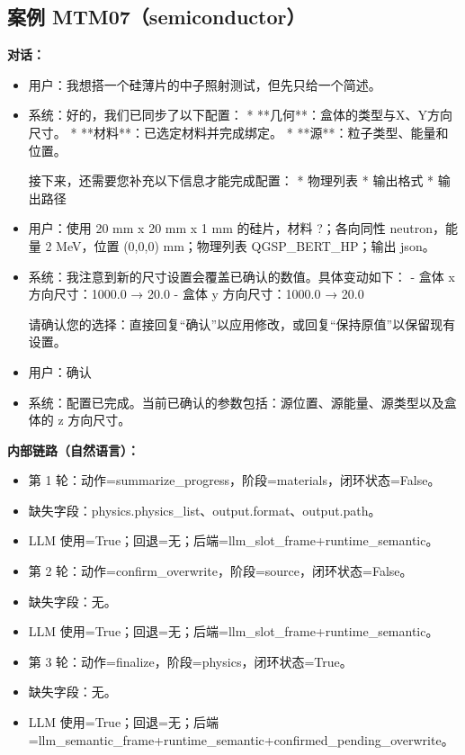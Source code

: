 \documentclass[11pt]{ctexart}
\begin{document}
\subsection{案例 MTM07（semiconductor）}
\textbf{对话：}
\begin{itemize}
\item 用户：我想搭一个硅薄片的中子照射测试，但先只给一个简述。
\item 系统：好的，我们已同步了以下配置：
*   **几何**：盒体的类型与X、Y方向尺寸。
*   **材料**：已选定材料并完成绑定。
*   **源**：粒子类型、能量和位置。

接下来，还需要您补充以下信息才能完成配置：
*   物理列表
*   输出格式
*   输出路径
\item 用户：使用 20 mm x 20 mm x 1 mm 的硅片，材料 ?；各向同性 neutron，能量 2 MeV，位置 (0,0,0) mm；物理列表 QGSP\_BERT\_HP；输出 json。
\item 系统：我注意到新的尺寸设置会覆盖已确认的数值。具体变动如下：
- 盒体 x 方向尺寸：1000.0 → 20.0
- 盒体 y 方向尺寸：1000.0 → 20.0

请确认您的选择：直接回复“确认”以应用修改，或回复“保持原值”以保留现有设置。
\item 用户：确认
\item 系统：配置已完成。当前已确认的参数包括：源位置、源能量、源类型以及盒体的 z 方向尺寸。
\end{itemize}
\textbf{内部链路（自然语言）：}
\begin{itemize}
\item 第 1 轮：动作=summarize\_progress，阶段=materials，闭环状态=False。
\item 缺失字段：physics.physics\_list、output.format、output.path。
\item LLM 使用=True；回退=无；后端=llm\_slot\_frame+runtime\_semantic。
\item 第 2 轮：动作=confirm\_overwrite，阶段=source，闭环状态=False。
\item 缺失字段：无。
\item LLM 使用=True；回退=无；后端=llm\_slot\_frame+runtime\_semantic。
\item 第 3 轮：动作=finalize，阶段=physics，闭环状态=True。
\item 缺失字段：无。
\item LLM 使用=True；回退=无；后端=llm\_semantic\_frame+runtime\_semantic+confirmed\_pending\_overwrite。
\end{itemize}
\end{document}
